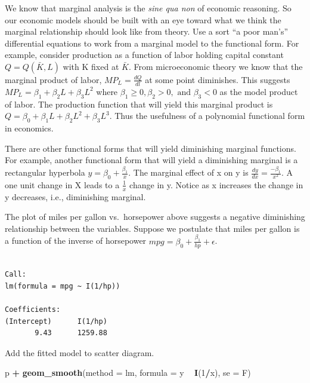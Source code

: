 \documentclass[]{book}
\newenvironment{Shaded}{\begin{snugshade}}{\end{snugshade}}
\newcommand{\DataTypeTok}[1]{\textcolor[rgb]{0.13,0.29,0.53}{#1}}
\newcommand{\DecValTok}[1]{\textcolor[rgb]{0.00,0.00,0.81}{#1}}
\newcommand{\KeywordTok}[1]{\textcolor[rgb]{0.13,0.29,0.53}{\textbf{#1}}}
\newcommand{\NormalTok}[1]{#1}
\newcommand{\OperatorTok}[1]{\textcolor[rgb]{0.81,0.36,0.00}{\textbf{#1}}}
\newcommand{\StringTok}[1]{\textcolor[rgb]{0.31,0.60,0.02}{#1}}
\begin{document}
We know that marginal analysis is the \emph{sine qua non} of economic reasoning. So our economic models should be built with an eye toward what we think the marginal relationship should look like from theory. Use a sort ``a poor man's'' differential equations to work from a marginal model to the functional form. For example, consider production as a function of labor holding capital constant \(Q=Q(\bar K, L)\) with K fixed at \(\bar K\). From microeconomic theory we know that the marginal product of labor, \(MP_L=\frac{dQ}{dl}\) at some point diminishes. This suggests \(MP_L=\beta_1+\beta_2L+\beta_3L^2\) where \(\beta_1\ge0, \beta_2>0, \text{ and } \beta_3<0\) as the model product of labor. The production function that will yield this marginal product is \(Q=\beta_0+\beta_1L+\beta_2L^2+\beta_3L^3\). Thus the usefulness of a polynomial functional form in economics.

There are other functional forms that will yield diminishing marginal functions. For example, another functional form that will yield a diminishing marginal is a rectangular hyperbola \(y=\beta_0+\frac{\beta_1}{x}\). The marginal effect of x on y is \(\frac{dy}{dx}=\frac{-\beta_1}{x^2}\). A one unit change in X leads to a \(\frac{1}{x}\) change in y. Notice as x increases the change in y decreases, i.e., diminishing marginal.

The plot of miles per gallon vs.~horsepower above suggests a negative diminishing relationship between the variables. Suppose we postulate that miles per gallon is a function of the inverse of horsepower \(mpg = \beta_0 + \frac{\beta_1}{hp}+\epsilon\).

\begin{Shaded}
\end{Shaded}

\begin{verbatim}

Call:
lm(formula = mpg ~ I(1/hp))

Coefficients:
(Intercept)      I(1/hp)  
       9.43      1259.88  
\end{verbatim}

Add the fitted model to scatter diagram.

\begin{Shaded}
\begin{Highlighting}[]
\NormalTok{p }\OperatorTok{+}\StringTok{ }
\StringTok{  }\KeywordTok{geom_smooth}\NormalTok{(}\DataTypeTok{method =}\NormalTok{ lm, }\DataTypeTok{formula =}\NormalTok{ y }\OperatorTok{~}\StringTok{ }\KeywordTok{I}\NormalTok{(}\DecValTok{1}\OperatorTok{/}\NormalTok{x), }\DataTypeTok{se =}\NormalTok{ F)}
\end{Highlighting}
\end{Shaded}
\end{document}
